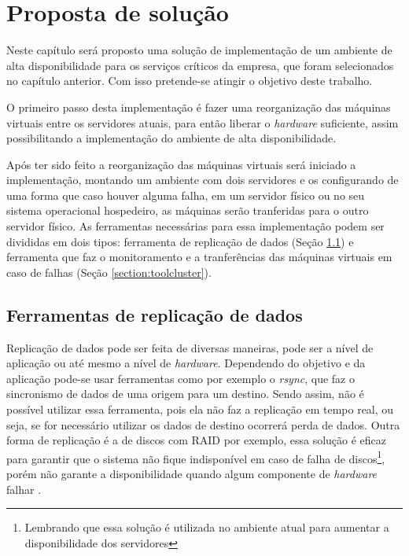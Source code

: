 \chapter{Proposta de solução}
\label{cap:propostadesolucao}

Neste capítulo será proposto uma solução de implementação de um ambiente de alta disponibilidade para os serviços críticos da empresa, que 
foram selecionados no capítulo anterior. Com isso pretende-se atingir o objetivo deste trabalho.

O primeiro passo desta implementação é fazer uma reorganização das máquinas virtuais entre os servidores atuais, para então liberar o 
\textit{hardware} suficiente, assim possibilitando a implementação do ambiente de alta disponibilidade. 

Após ter sido feito a reorganização das máquinas virtuais será iniciado a implementação, montando um ambiente com dois servidores e os configurando 
de uma forma que caso houver alguma falha, em um servidor físico ou no seu sistema operacional hospedeiro, as máquinas serão tranferidas para 
o outro servidor físico. As ferramentas necessárias para essa implementação podem ser divididas em dois tipos: ferramenta de replicação de dados 
(Seção \ref{section:toolrepl}) e ferramenta que faz o monitoramento e a tranferências das máquinas virtuais em caso de falhas 
(Seção \ref{section:toolcluster}).

\section{Ferramentas de replicação de dados}
\label{section:toolrepl}

Replicação de dados pode ser feita de diversas maneiras, pode ser a nível de aplicação ou até mesmo a nível de \textit{hardware}.
Dependendo do objetivo e da aplicação pode-se usar ferramentas como por exemplo o \textit{rsync}, que faz o sincronismo de dados de uma origem
para um destino. Sendo assim, não é possível utilizar essa ferramenta, pois ela não faz a replicação em tempo real, ou seja, se for necessário
utilizar os dados de destino ocorrerá perda de dados. Outra forma de replicação é a de discos com \ac{RAID} por exemplo, essa solução é eficaz
para garantir que o sistema não fique indisponível em caso de falha de discos\footnote{Lembrando que essa solução é utilizada no ambiente atual
para aumentar a disponibilidade dos servidores}, porém não garante a disponibilidade quando algum componente de \textit{hardware} falhar 
\cite{zaminhani2008}.


